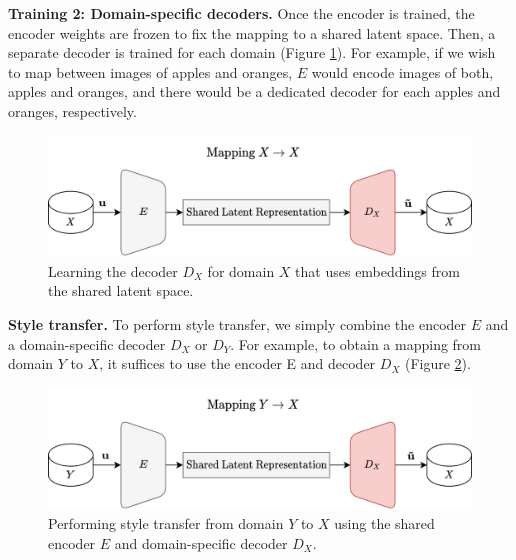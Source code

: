 \documentclass{article}
\begin{document}
\textbf{Training 2: Domain-specific decoders.} Once the encoder is trained, the encoder weights are frozen to fix the mapping to a shared latent space. Then, a separate decoder is trained for each domain (Figure \ref{fig:train}). For example, if we wish to map between images of apples and oranges, $E$ would encode images of both, apples and oranges, and there would be a dedicated decoder for each apples and oranges, respectively. 
\begin{figure}[H]
  \centering
  \includegraphics[width=0.7\linewidth]{report/assets/train.png}
  \caption{Learning the decoder $D_X$ for domain $X$ that uses embeddings from the shared latent space.}
  \label{fig:train}
\end{figure}
    
    

\textbf{Style transfer.} To perform style transfer, we simply combine the encoder $E$ and a domain-specific decoder $D_X$ or $D_Y$. For example, to obtain a mapping from domain $Y$ to $X$, it suffices to use the encoder E and decoder $D_X$ (Figure \ref{fig:eval}).

\begin{figure}
  \centering
  \includegraphics[width=0.7\linewidth]{report/assets/eval.png}
  \caption{Performing style transfer from domain $Y$ to $X$ using the shared encoder $E$ and domain-specific decoder $D_X$.}
  \label{fig:eval}
\end{figure}
\end{document}
